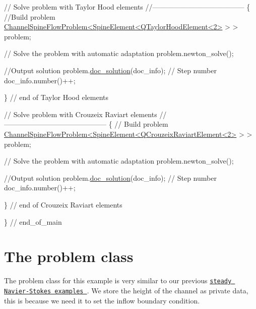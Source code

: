 \begin{DoxyCodeInclude}
 \textcolor{comment}{// Solve problem with Taylor Hood elements}
 \textcolor{comment}{//---------------------------------------}
 \{
  \textcolor{comment}{//Build problem}
  \hyperlink{classChannelSpineFlowProblem}{ChannelSpineFlowProblem<SpineElement<QTaylorHoodElement<2>}
       > >
   problem;
  
  \textcolor{comment}{// Solve the problem with automatic adaptation}
  problem.newton\_solve();
  
  \textcolor{comment}{//Output solution}
  problem.\hyperlink{classChannelSpineFlowProblem_a101bdeee56502231945cbac272ca21f6}{doc\_solution}(doc\_info);
  \textcolor{comment}{// Step number}
  doc\_info.number()++;

 \} \textcolor{comment}{// end of Taylor Hood elements}
 
 
 \textcolor{comment}{// Solve problem with Crouzeix Raviart elements}
 \textcolor{comment}{//--------------------------------------------}
 \{
  \textcolor{comment}{// Build problem}
  \hyperlink{classChannelSpineFlowProblem}{ChannelSpineFlowProblem<SpineElement<QCrouzeixRaviartElement<2>}
       > >
   problem;
  
  \textcolor{comment}{// Solve the problem with automatic adaptation}
  problem.newton\_solve();
  
  \textcolor{comment}{//Output solution}
  problem.\hyperlink{classChannelSpineFlowProblem_a101bdeee56502231945cbac272ca21f6}{doc\_solution}(doc\_info);
  \textcolor{comment}{// Step number}
  doc\_info.number()++;
  
 \} \textcolor{comment}{// end of Crouzeix Raviart elements}
      

     
\} \textcolor{comment}{// end\_of\_main}

\end{DoxyCodeInclude}




 

\hypertarget{index_problem}{}\section{The problem class}\label{index_problem}
The problem class for this example is very similar to our previous \href{../../driven_cavity/html/index.html#problem}{\tt steady Navier-\/\+Stokes examples }. We store the height of the channel as private data, this is because we need it to set the inflow boundary condition.

